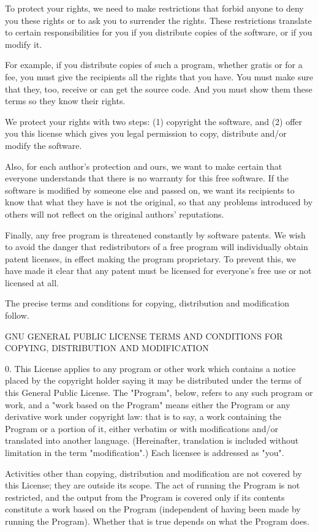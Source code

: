 \documentclass{doc}
\begin{document}
  To protect your rights, we need to make restrictions that forbid
anyone to deny you these rights or to ask you to surrender the rights.
These restrictions translate to certain responsibilities for you if you
distribute copies of the software, or if you modify it.

  For example, if you distribute copies of such a program, whether
gratis or for a fee, you must give the recipients all the rights that
you have.  You must make sure that they, too, receive or can get the
source code.  And you must show them these terms so they know their
rights.

  We protect your rights with two steps: (1) copyright the software, and
(2) offer you this license which gives you legal permission to copy,
distribute and/or modify the software.

  Also, for each author's protection and ours, we want to make certain
that everyone understands that there is no warranty for this free
software.  If the software is modified by someone else and passed on, we
want its recipients to know that what they have is not the original, so
that any problems introduced by others will not reflect on the original
authors' reputations.

  Finally, any free program is threatened constantly by software
patents.  We wish to avoid the danger that redistributors of a free
program will individually obtain patent licenses, in effect making the
program proprietary.  To prevent this, we have made it clear that any
patent must be licensed for everyone's free use or not licensed at all.

  The precise terms and conditions for copying, distribution and
modification follow.

		    GNU GENERAL PUBLIC LICENSE
   TERMS AND CONDITIONS FOR COPYING, DISTRIBUTION AND MODIFICATION

  0. This License applies to any program or other work which contains
a notice placed by the copyright holder saying it may be distributed
under the terms of this General Public License.  The "Program", below,
refers to any such program or work, and a "work based on the Program"
means either the Program or any derivative work under copyright law:
that is to say, a work containing the Program or a portion of it,
either verbatim or with modifications and/or translated into another
language.  (Hereinafter, translation is included without limitation in
the term "modification".)  Each licensee is addressed as "you".

Activities other than copying, distribution and modification are not
covered by this License; they are outside its scope.  The act of
running the Program is not restricted, and the output from the Program
is covered only if its contents constitute a work based on the
Program (independent of having been made by running the Program).
Whether that is true depends on what the Program does.
\end{document}
